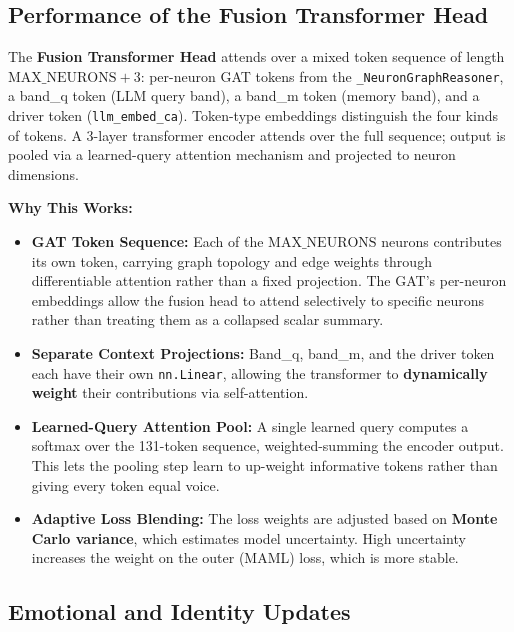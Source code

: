 \documentclass[12pt]{article}
\begin{document}
\subsection{Performance of the Fusion Transformer Head}
\label{subsec:fusion_head}

The \textbf{Fusion Transformer Head} attends over a mixed token sequence
of length $\text{MAX\_NEURONS} + 3$: per-neuron GAT tokens from the
\texttt{\_NeuronGraphReasoner}, a band\_q token (LLM query band), a
band\_m token (memory band), and a driver token (\texttt{llm\_embed\_ca}).
Token-type embeddings distinguish the four kinds of tokens. A 3-layer
transformer encoder attends over the full sequence; output is pooled via
a learned-query attention mechanism and projected to neuron dimensions.

\textbf{Why This Works:}
\begin{itemize}
    \item \textbf{GAT Token Sequence:}
    Each of the $\text{MAX\_NEURONS}$ neurons contributes its own token,
    carrying graph topology and edge weights through differentiable
    attention rather than a fixed projection. The GAT's per-neuron
    embeddings allow the fusion head to attend selectively to specific
    neurons rather than treating them as a collapsed scalar summary.

    \item \textbf{Separate Context Projections:}
    Band\_q, band\_m, and the driver token each have their own
    \texttt{nn.Linear}, allowing the transformer to
    \textbf{dynamically weight} their contributions via self-attention.

    \item \textbf{Learned-Query Attention Pool:}
    A single learned query computes a softmax over the 131-token
    sequence, weighted-summing the encoder output. This lets the
    pooling step learn to up-weight informative tokens rather than
    giving every token equal voice.

    \item \textbf{Adaptive Loss Blending:}
    The loss weights are adjusted based on \textbf{Monte Carlo
    variance}, which estimates model uncertainty. High uncertainty
    increases the weight on the outer (MAML) loss, which is more
    stable.
\end{itemize}

\subsection{Emotional and Identity Updates}
\label{subsec:emotional}
\end{document}
